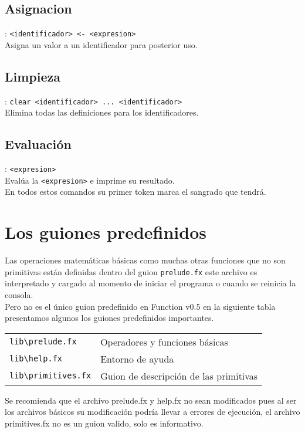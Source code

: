       \subsection*{Asignacion}: \texttt{<identificador>~\texttt{<-}~<expresion>}\\
      Asigna un valor a un identificador para posterior uso.
      
      \subsection*{Limpieza}: \texttt{clear~<identificador>~...~<identificador>}\\
      Elimina todas las definiciones para los identificadores.
      
      \subsection*{Evaluación}: \texttt{<expresion>}\\
      Evalúa la \texttt{<expresion>} e imprime su resultado.
      \\
      
      En todos estos comandos su primer token marca el sangrado que tendrá.
      
      
   \section{Los guiones predefinidos}
      Las operaciones matemáticas básicas como muchas otras funciones que no son primitivas están definidas dentro del guion \texttt{prelude.fx} este archivo es interpretado y cargado al momento de iniciar el programa o cuando se reinicia la consola.
      \\
      
      Pero no es el único guion predefinido en Function v0.5 en la siguiente tabla presentamos algunos los guiones predefinidos importantes.
      
      \begin{longtable}[c]{ll}
         \texttt{lib\textbackslash prelude.fx} & Operadores y funciones básicas\\
         \texttt{lib\textbackslash help.fx} & Entorno de ayuda\\
         \texttt{lib\textbackslash primitives.fx} & Guion de descripción de las primitivas
      \end{longtable}
      
      Se recomienda que el archivo prelude.fx y help.fx no sean modificados pues al ser los archivos básicos su modificación podría llevar a errores de ejecución, el archivo primitives.fx no es un guion valido, solo es informativo.
      
      
      
      
      
      
      
      
      